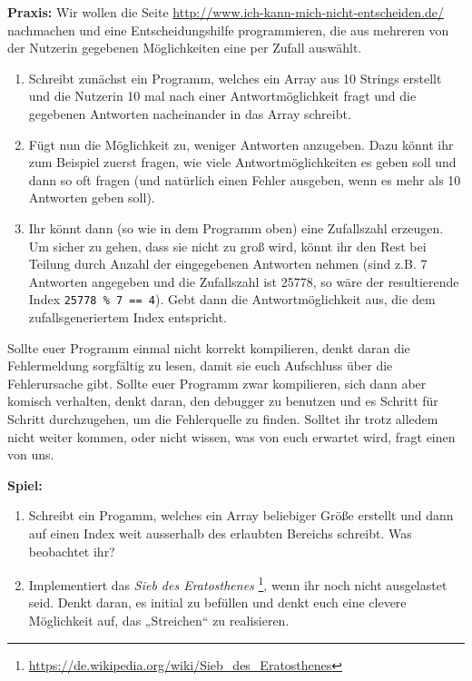 \textbf{Praxis:}
Wir wollen die Seite \url{http://www.ich-kann-mich-nicht-entscheiden.de/}
nachmachen und eine Entscheidungshilfe programmieren, die aus mehreren von der
Nutzerin gegebenen Möglichkeiten eine per Zufall auswählt.

\begin{enumerate}
    \item Schreibt zunächst ein Programm, welches ein Array aus 10 Strings
        erstellt und die Nutzerin 10 mal nach einer Antwortmöglichkeit fragt
        und die gegebenen Antworten nacheinander in das Array schreibt.
    \item Fügt nun die Möglichkeit zu, weniger Antworten anzugeben. Dazu könnt
        ihr zum Beispiel zuerst fragen, wie viele Antwortmöglichkeiten es geben
        soll und dann so oft fragen (und natürlich einen Fehler ausgeben, wenn
        es mehr als 10 Antworten geben soll).
    \item Ihr könnt dann (so wie in dem Programm oben) eine Zufallszahl
        erzeugen. Um sicher zu gehen, dass sie nicht zu groß wird, könnt ihr
        den Rest bei Teilung durch Anzahl der eingegebenen Antworten nehmen
        (sind z.B. 7 Antworten angegeben und die Zufallszahl ist 25778, so wäre
        der resultierende Index \texttt{25778 \% 7 == 4}). Gebt dann die
        Antwortmöglichkeit aus, die dem zufallsgeneriertem Index
        entspricht.
\end{enumerate}

Sollte euer Programm einmal nicht korrekt kompilieren, denkt daran die
Fehlermeldung sorgfältig zu lesen, damit sie euch Aufschluss über die
Fehlerursache gibt. Sollte euer Programm zwar kompilieren, sich dann aber
komisch verhalten, denkt daran, den debugger zu benutzen und es Schritt für
Schritt durchzugehen, um die Fehlerquelle zu finden. Solltet ihr trotz alledem
nicht weiter kommen, oder nicht wissen, was von euch erwartet wird, fragt einen
von uns.

\textbf{Spiel:}
\begin{enumerate}
    \item Schreibt ein Progamm, welches ein Array beliebiger Größe erstellt und
        dann auf einen Index weit ausserhalb des erlaubten Bereichs schreibt.
        Was beobachtet ihr?
    \item Implementiert das \emph{Sieb des Eratosthenes}
        \footnote{\url{https://de.wikipedia.org/wiki/Sieb_des_Eratosthenes}},
        wenn ihr noch nicht ausgelastet seid.
        Denkt daran, es initial zu befüllen und denkt euch eine clevere
        Möglichkeit auf, das „Streichen“ zu realisieren.
\end{enumerate}
